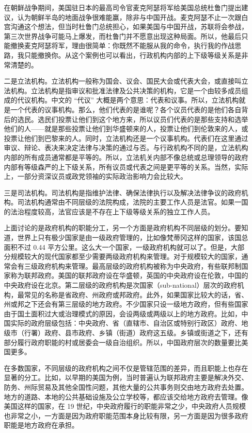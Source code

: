 在朝鲜战争期间，美国驻日本的最高司令官麦克阿瑟将军给美国总统杜鲁门提出建议，认为朝鲜半岛的地面战争很难能赢，除非与中国开战。麦克阿瑟不止一次跟白宫沟通这个想法，但当时杜鲁门总统担心，如果美国与中国开战，苏联将会参战，第三次世界战争可能马上爆发，而杜鲁门并不愿意出现这种局面。所以，他最后只能撤换麦克阿瑟将军，理由很简单：你既然不能服从我的命令，执行我的作战思路，我只能撤换你。从这个案例也可以看出，行政机构内部的上下级等级关系是非常清楚的。

二是立法机构。立法机构一般称为国会、议会、国民大会或代表大会，或直接叫立法机构。立法机构是指审议和批准法律及公共决策的机构，它是一个由较多成员组成的代议机构。中文的 “代议” 大概是两个意思：代表和议事。所以，立法机构就是一个代表的议事机构。那么，他们代表的是谁呢？各个议员代表的是他们各自背后的选民。选民们投票让他们到这个地方来，所以议员们代表的是那些支持和选举他们的人——就是那些投票让他们到华盛顿来的人，投票让他们到伦敦来的人，或投票让他们到巴黎来的人。同时，立法机构还是一个议事机构。代表们在这里通过审议、辩论、表决来决定法律与决策的通过与否。与行政机构不同的是，立法机构内部的所有成员通常都是平等的。所以，立法机关内部不像总统或总理领导的政府内部有等级森严的上下级关系，所有议员或代表之间是更平等的关系。当然，实际上，一部分资深议员或政党领袖的实际政治影响力会比较大。

三是司法机构。司法机构是指维护法律、确保法律执行以及解决法律争议的政府机构。司法机构通常由不同层级的法院构成，法院的主要工作人员是法官。如果一国的法治程度较高，法官应该是不存在上下级等级关系的独立工作人员。

上面讨论的是政府机构的职能分工，另一个方面是政府机构不同层级的划分。要知道，世界上只有极少国家是由一级政府管理的，比如像梵蒂冈这样的国家，该国总面积不过 0.44 平方公里。这么大一个国家，一级政府机构就可以了。但是，大部分规模较大的现代国家都至少需要两级政府机构来管理。对于规模较大的国家，通常会有三级政府机构来管理。最高层级的政府机构被称为中央政府，有些联邦制国家称为联邦政府。美国的联邦政府设在华盛顿，英国的中央政府设在伦敦，中国的中央政府设在北京。第二层级的政府机构是次国家（sub-national）层次的政府机构，最常见的名称是省政府、州政府或邦政府。此外，如果国家比较大的话，省、州或邦之下还会有第三层级的地方政府。不少国家只设一级地方政府，但有些国家由于国土面积过大或治理模式的原因，会设两级或两级以上的地方政府。比如，中国实际的政府层级包括：中央政府、省（直辖市、自治区或特别行政区）政府、地级市（行署）政府、县市政府、乡镇（街道）政府这五级。乡镇或街道之下，还有部分履行政府职能的村或居委会一级自治组织。所以，中国政府层次的数量要比美国更多。

在多数国家，不同层级的政府机构之间不仅是管辖范围的差异，而且职能上也存在显著的分工。比如，以早期的美国为例，当时普遍认为联邦政府主要是解决外交、防务、州际贸易及其他全国性问题，其他大量的公共事务则交由地方政府去处置。地方的道路、本地的公共基础设施及公立学校等，都应该交给地方政府去管理。像美国这样的国家，在 19 世纪，中央政府履行的职能非常之少，中央政府人员规模也非常之小，一方面是因为政府职能范围本身比较有限，另一方面是因为很多政府职能是地方政府在承担。

